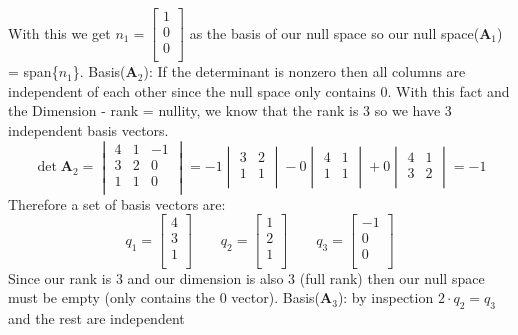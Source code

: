 \documentclass{article}
\begin{document}
With this we get
$
n_1
=
\begin{bmatrix}
1 \\
0 \\
0 \\
\end{bmatrix}
$
as the basis of our null space so our null space($\mathbf{A}_1$) = span\{$n_1$\}.
\newline
Basis($\mathbf{A}_2$): If the determinant is nonzero then all columns are independent of each other since the null space only contains $0$.
With this fact and the Dimension - rank = nullity, we know that the rank is 3 so we have 3 independent basis vectors.
$$
\det{\mathbf{A}_2}
=
\begin{vmatrix}
4 & 1 & -1 \\
3 & 2 & 0 \\
1 & 1 & 0 \\
\end{vmatrix}
= -1
\begin{vmatrix}
3 & 2 \\
1 & 1 \\
\end{vmatrix}
-0
\begin{vmatrix}
4 & 1 \\
1 & 1 \\
\end{vmatrix}
+0
\begin{vmatrix}
4 & 1 \\
3 & 2 \\
\end{vmatrix}
=-1
$$
Therefore a set of basis vectors are:
$$
q_1 =
\begin{bmatrix}
4 \\
3 \\
1 \\
\end{bmatrix}
\qquad
q_2 =
\begin{bmatrix}
1 \\
2 \\
1 \\
\end{bmatrix}
\qquad
q_3 =
\begin{bmatrix}
-1\\
0 \\
0 \\
\end{bmatrix}
$$
Since our rank is $3$ and our dimension is also $3$ (full rank) then our null space must be empty (only contains the $0$ vector).
\newline
Basis($\mathbf{A}_3$): by inspection $2 \cdot q_2 = q_3$ and the rest are independent
\end{document}
